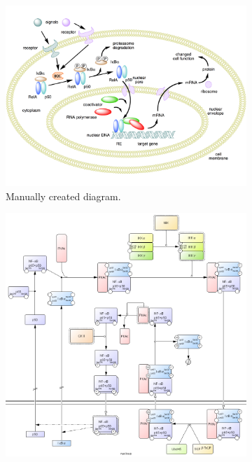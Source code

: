 \documentclass[
	fontsize=10pt, %
	twoside=false, %
	secnumdepth=1, %
  toc=indentunnumbered %
]{kaobook}
\begin{document}
\begin{figure}[h]
  \centering
  \begin{subfigure}{0.4\textwidth}
    \centering
    \includegraphics[width=\textwidth]{NF-kB-mechanism/handdrawn.png}
    \caption{Manually created diagram.}
    \label{fig:process-diagram-old-vs-new:handdrawn}
  \end{subfigure}
  \hspace{1em}
  \begin{subfigure}{0.4\textwidth}
    \centering
    \includegraphics[width=\textwidth]{NF-kB-mechanism/CellDesigner.png}

\end{subfigure}
\end{figure}
\end{document}
